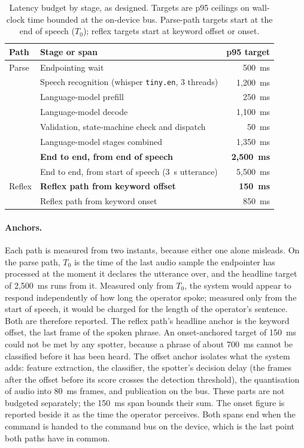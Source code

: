 \begin{table}[htbp]
\centering
\footnotesize
\caption[Latency budget by stage]{Latency budget by stage, as designed. Targets are p95 ceilings on wall-clock time bounded at the on-device bus. Parse-path targets start at the end of speech ($T_0$); reflex targets start at keyword offset or onset.}
\label{tab:stage-budget}
\begin{tabularx}{\textwidth}{@{}l X r@{}}
\toprule
Path & Stage or span & p95 target \\
\midrule
Parse & Endpointing wait & 500~ms \\
      & Speech recognition (whisper \texttt{tiny.en}, 3 threads) & 1{,}200~ms \\
      & Language-model prefill & 250~ms \\
      & Language-model decode & 1{,}100~ms \\
      & Validation, state-machine check and dispatch & 50~ms \\
      & Language-model stages combined & 1{,}350~ms \\
      & \textbf{End to end, from end of speech} & \textbf{2{,}500~ms} \\
      & End to end, from start of speech (3~s utterance) & 5{,}500~ms \\
\midrule
Reflex & \textbf{Reflex path from keyword offset} & \textbf{150~ms} \\
       & Reflex path from keyword onset & 850~ms \\
\bottomrule
\end{tabularx}
\end{table}

\paragraph{Anchors.} Each path is measured from two instants, because either one alone misleads.
On the parse path, $T_0$ is the time of the last audio sample the endpointer has processed at the
moment it declares the utterance over, and the headline target of 2{,}500~ms runs from it.
Measured only from $T_0$, the system would appear to respond independently of how long the
operator spoke; measured only from the start of speech, it would be charged for the length of
the operator's sentence. Both are therefore reported. The reflex path's headline anchor is the
keyword offset, the last frame of the spoken phrase. An onset-anchored target of 150~ms could not
be met by any spotter, because a phrase of about 700~ms cannot be classified before it has been
heard. The offset anchor isolates what the system adds: feature extraction, the classifier, the
spotter's decision delay (the frames after the offset before its score crosses the detection
threshold), the quantisation of audio into 80~ms frames, and publication on the bus. These parts
are not budgeted separately; the 150~ms span bounds their sum. The onset figure is reported
beside it as the time the operator perceives. Both spans end when the command is handed to the
command bus on the device, which is the last point both paths have in common.


